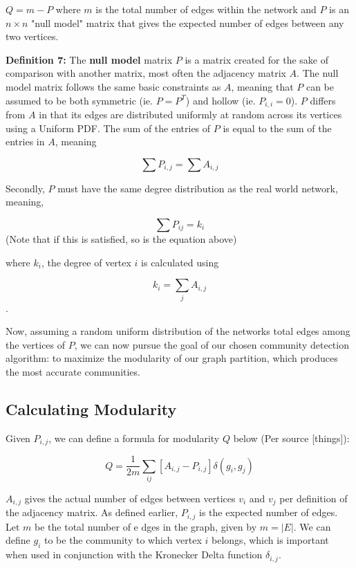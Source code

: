 \documentclass{article}
\begin{document}
\indent $Q = m - P$ where $m$ is the total number of edges within the network and $P$ is an $n \times n$ "null model" matrix that gives the expected number of edges between any two vertices. 

\bigskip

\textbf{Definition 7:} The \textbf{null model} matrix $P$ is a matrix created for the sake of comparison with another matrix, most often the adjacency matrix $A$. 
The null model matrix follows the same basic constraints as $A$, meaning that $P$ can be assumed to be both symmetric (ie. $P = P^T$) and hollow (ie. $P_{i,i} = 0$). 
$P$ differs from $A$ in that its edges are distributed uniformly at random across its vertices using a Uniform PDF. 
The sum of the entries of $P$ is equal to the sum of the entries in $A$, meaning

$$\sum P_{i,j} = \sum A_{i,j}$$

\bigskip

Secondly, $P$ must have the same degree distribution as the real world network, meaning,

\bigskip

$$\sum P_{ij} = k_{i}$$
(Note that if this is satisfied, so is the equation above)

\bigskip

where $k_{i}$, the degree of vertex $i$ is calculated using

\bigskip

$$k_{i} = \sum_{j} A_{i,j}$$.

\bigskip

\noindent Now, assuming a random uniform distribution of the networks total edges among the vertices of $P$, 
we can now pursue the goal of our chosen community detection algorithm: to maximize the modularity of our graph partition, 
which produces the most accurate communities.

\bigskip

\subsection{Calculating Modularity}
Given $P_{i,j}$, we can define a formula for modularity $Q$ below (Per source [things]):

$$ Q = \dfrac{1}{2m}\sum_{ij} [A_{i,j} - P_{i,j}]\delta (g_i, g_j) $$ 

$A_{i,j}$ gives the actual number of edges between vertices $v_i$ and $v_j$ per definition of the adjacency matrix.
As defined earlier, $P_{i,j}$ is the expected number of edges. 
Let $m$ be the total number of e  dges in the graph, given by $m = |E|$. 
We can define $g_i$ to be the community to which vertex $i$ belongs, which is important when used in conjunction with the Kronecker Delta function $\delta_{i,j}$.
\end{document}
